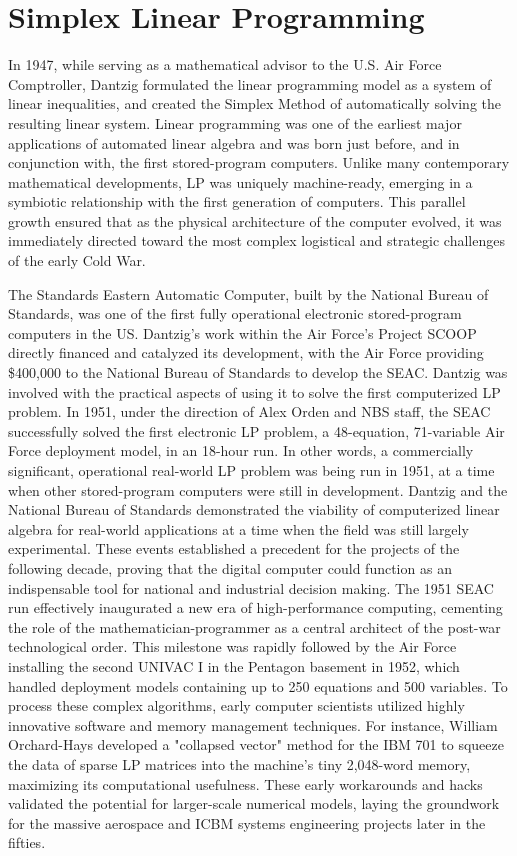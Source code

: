 \section{Simplex Linear Programming}

In 1947, while serving as a mathematical advisor to the U.S. Air Force Comptroller, Dantzig formulated the linear programming model as a system of linear inequalities, and created the Simplex Method of automatically solving the resulting linear system. Linear programming was one of the earliest major applications of automated linear algebra and was born just before, and in conjunction with, the first stored-program computers. Unlike many contemporary mathematical developments, LP was uniquely machine-ready, emerging in a symbiotic relationship with the first generation of computers. This parallel growth ensured that as the physical architecture of the computer evolved, it was immediately directed toward the most complex logistical and strategic challenges of the early Cold War. 

The Standards Eastern Automatic Computer, built by the National Bureau of Standards, was one of the first fully operational electronic stored-program computers in the US. Dantzig's work within the Air Force's Project SCOOP directly financed and catalyzed its development, with the Air Force providing \$400,000 to the National Bureau of Standards to develop the SEAC. Dantzig was involved with the practical aspects of using it to solve the first computerized LP problem. In 1951, under the direction of Alex Orden and NBS staff, the SEAC successfully solved the first electronic LP problem, a 48-equation, 71-variable Air Force deployment model, in an 18-hour run. In other words, a commercially significant, operational real-world LP problem was being run in 1951, at a time when other stored-program computers were still in development. Dantzig and the National Bureau of Standards demonstrated the viability of computerized linear algebra for real-world applications at a time when the field was still largely experimental. These events established a precedent for the projects of the following decade, proving that the digital computer could function as an indispensable tool for national and industrial decision making. The 1951 SEAC run effectively inaugurated a new era of high-performance computing, cementing the role of the mathematician-programmer as a central architect of the post-war technological order.
This milestone was rapidly followed by the Air Force installing the second UNIVAC I in the Pentagon basement in 1952, which handled deployment models containing up to 250 equations and 500 variables. To process these complex algorithms, early computer scientists utilized highly innovative software and memory management techniques. For instance, William Orchard-Hays developed a "collapsed vector" method for the IBM 701 to squeeze the data of sparse LP matrices into the machine's tiny 2,048-word memory, maximizing its computational usefulness. These early workarounds and hacks validated the potential for larger-scale numerical models, laying the groundwork for the massive aerospace and ICBM systems engineering projects later in the fifties. 

